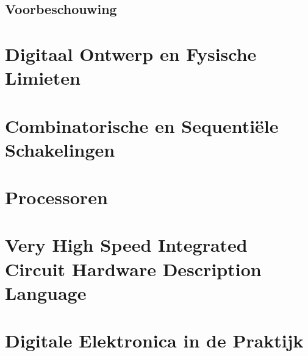 \documentclass[a4paper,10pt,titlepage]{book}
\begin{document}
\chapter*{Voorbeschouwing}
\mainmatter
\part{Digitaal Ontwerp en Fysische Limieten}


\part{Combinatorische en Sequenti\"ele Schakelingen}


\part{Processoren}


\part{Very High Speed Integrated Circuit Hardware Description Language}

\part{Digitale Elektronica in de Praktijk}


\appendix
\end{document}
